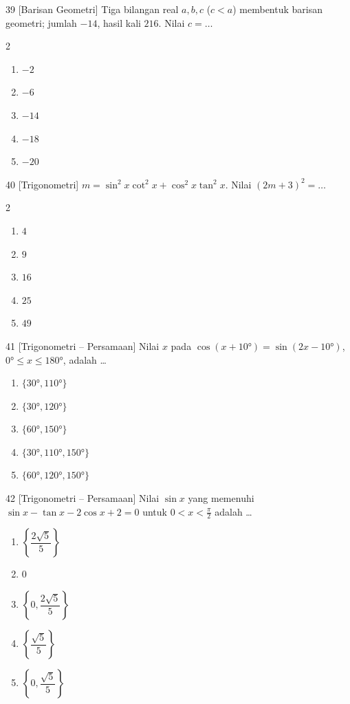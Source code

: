 \documentclass[11pt]{article}
\newenvironment{pil}{%
  \begin{enumerate}[label=(\alph*),leftmargin=*,itemsep=1pt,topsep=3pt]}%
  {\end{enumerate}}
\newenvironment{pilB}{%
  \par\smallskip\begin{multicols}{2}
  \begin{enumerate}[label=(\alph*),leftmargin=*,itemsep=1pt,topsep=3pt]}%
  {\end{enumerate}\end{multicols}}
\begin{document}
\begin{soal}{39 \normalfont\small[Barisan Geometri]}
Tiga bilangan real $a,b,c$ ($c<a$) membentuk barisan geometri; jumlah $-14$, hasil kali $216$.
Nilai $c=\ldots$
\begin{pilB}
  \item $-2$ \item $-6$ \item $-14$ \item $-18$ \item $-20$
\end{pilB}
\end{soal}

\begin{soal}{40 \normalfont\small[Trigonometri]}
$m=\sin^2x\cot^2x+\cos^2x\tan^2x$. Nilai $(2m+3)^2=\ldots$
\begin{pilB}
  \item $4$ \item $9$ \item $16$ \item $25$ \item $49$
\end{pilB}
\end{soal}

\begin{soal}{41 \normalfont\small[Trigonometri -- Persamaan]}
Nilai $x$ pada $\cos(x+10°)=\sin(2x-10°)$, $0°\leq x\leq180°$, adalah \ldots
\begin{pil}
  \item $\{30°,110°\}$ \item $\{30°,120°\}$
  \item $\{60°,150°\}$ \item $\{30°,110°,150°\}$ \item $\{60°,120°,150°\}$
\end{pil}
\end{soal}

\begin{soal}{42 \normalfont\small[Trigonometri -- Persamaan]}
Nilai $\sin x$ yang memenuhi $\sin x-\tan x-2\cos x+2=0$ untuk $0<x<\tfrac\pi2$ adalah \ldots
\begin{pil}
  \item $\left\{\dfrac{2\sqrt5}{5}\right\}$ \item $0$
  \item $\left\{0,\dfrac{2\sqrt5}{5}\right\}$ \item $\left\{\dfrac{\sqrt5}{5}\right\}$ \item $\left\{0,\dfrac{\sqrt5}{5}\right\}$
\end{pil}
\end{soal}
\end{document}
